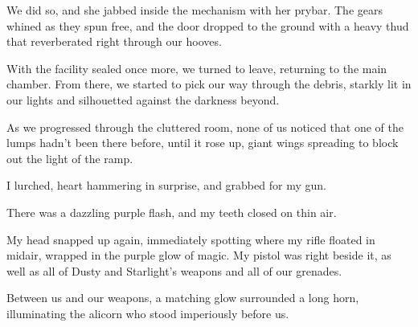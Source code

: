 We did so, and she jabbed inside the mechanism with her prybar. The gears whined as they spun free, and the door dropped to the ground with a heavy thud that reverberated right through our hooves.

With the facility sealed once more, we turned to leave, returning to the main chamber. From there, we started to pick our way through the debris, starkly lit in our lights and silhouetted against the darkness beyond.

As we progressed through the cluttered room, none of us noticed that one of the lumps hadn’t been there before, until it rose up, giant wings spreading to block out the light of the ramp.

I lurched, heart hammering in surprise, and grabbed for my gun.

There was a dazzling purple flash, and my teeth closed on thin air.

My head snapped up again, immediately spotting where my rifle floated in midair, wrapped in the purple glow of magic. My pistol was right beside it, as well as all of Dusty and Starlight’s weapons and all of our grenades.

Between us and our weapons, a matching glow surrounded a long horn, illuminating the alicorn who stood imperiously before us.
